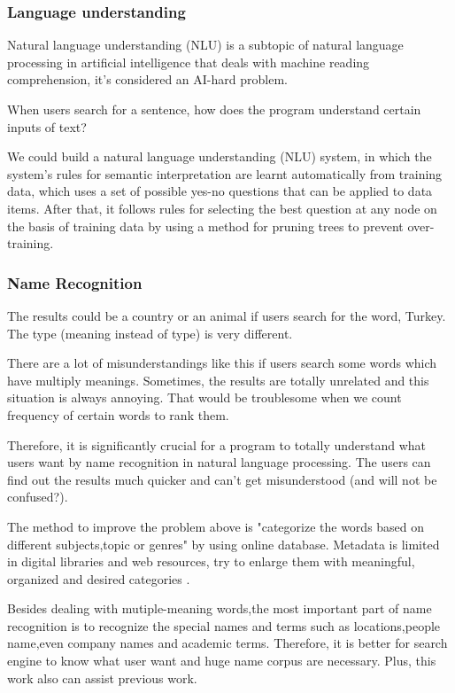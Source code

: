 \subsubsection*{Language understanding}
Natural language understanding (NLU) is a subtopic of natural language processing in artificial intelligence that deals with machine reading comprehension, it's considered an AI-hard problem.

When users search for a sentence, how does the program understand certain inputs of text? 

We could build a natural language understanding (NLU) system, in which the system's rules for semantic interpretation are 
learnt automatically from training data, which uses a set of possible yes-no questions that can be applied to data items.
After that, it follows rules for selecting the best question at any node on the basis of training data by using a method for pruning trees to prevent over-training.

\subsubsection*{Name Recognition}

The results could be a country or an animal if users search for the word, Turkey. The type (meaning instead of type) is very different.

There are a lot of misunderstandings like this if users search some words which have multiply meanings.
Sometimes, the results are totally unrelated and this situation is always annoying. 
That would be troublesome when we count frequency of certain words to rank them.

Therefore, it is significantly crucial for a program to totally understand what users want by name recognition in natural language processing. 
The users can find out the results much quicker and can't get misunderstood (and will not be confused?).

The method to improve the problem above is "categorize the words based on different subjects,topic or genres" by using online database.
Metadata is limited in digital libraries and web resources, try to enlarge them with meaningful, organized and desired
categories \cite{Kules2006}.

Besides dealing with mutiple-meaning words,the most important part of name recognition is to recognize the special names and terms such as locations,people name,even company names and academic terms.
Therefore, it is better for search engine to know what user want and huge name corpus are necessary. Plus, this work also can assist previous work.



